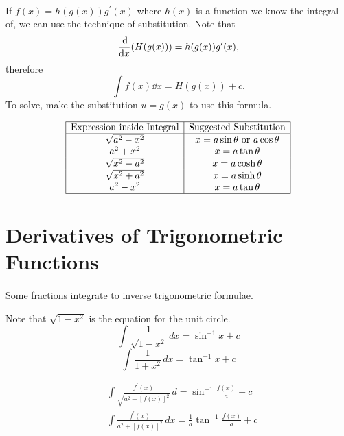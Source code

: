 \documentclass[../multivariate_calculus.tex]{subfiles}
\begin{document}
        \paragraph{}
        If $f(x)=h(g(x))g^\prime(x)$ where $h(x)$ is a function we know the integral of, we can use the technique of substitution.
        Note that
        \begin{equation}
            \dv{}{x}(H(g(x)))=h(g(x))g^\prime(x),
        \end{equation}
        therefore
        \begin{equation}
            \int f(x)\dd{x}=H(g(x))+c.
        \end{equation}
        To solve, make the substitution $u=g(x)$ to use this formula.
        \begin{center}
            \[\begin{array}{|c|c|}
                \hline
                \text{Expression inside Integral} & \text{Suggested Substitution} \\
                \hline
                \sqrt{a^2-x^2} & x=a\sin\theta\ \text{or}\ a\cos\theta\\ 
                a^2 + x^2 & x=a\tan\theta \\
                \sqrt{x^2-a^2} & x=a\cosh\theta \\
                \sqrt{x^2+a^2} & x=a\sinh\theta \\
                a^2-x^2 & x=a\tan\theta \\
                \hline
            \end{array}\]
        \end{center}

    \section{Derivatives of Trigonometric Functions}
        \paragraph{}
        Some fractions integrate to inverse trigonometric formulae.
        \begin{example}
            Note that $\sqrt{1-x^2}$ is the equation for the unit circle.
            \begin{equation*}
                \int\frac{1}{\sqrt{1-x^2}}\,dx = \sin^{-1}x+c
            \end{equation*}
            \begin{equation*}
                \int\frac{1}{1+x^2}\,dx = \tan^{-1}x+c
            \end{equation*}
        \end{example}
        \begin{align*}
            &\int\frac{f^\prime(x)}{\sqrt{a^2-\left[f(x)\right]^2}}\,d = \sin^{-1}\frac{f(x)}{a}+c \\
            &\int\frac{f^\prime(x)}{a^2+\left[f(x)\right]^2}\,dx = \frac{1}{a}\tan^{-1}\frac{f(x)}{a}+c
        \end{align*}
        
\end{document}
